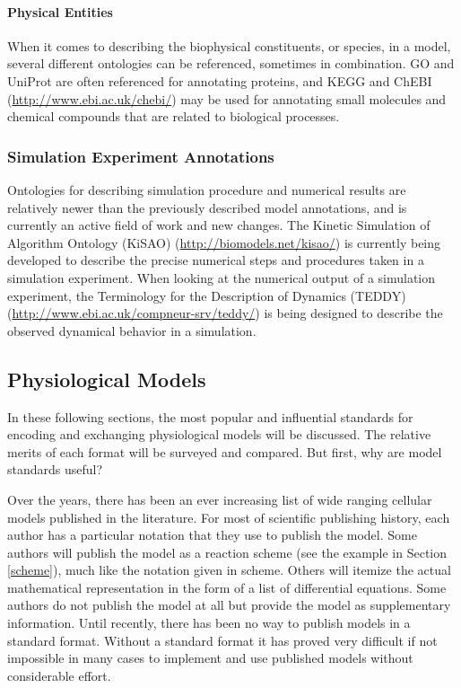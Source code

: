 \paragraph{Physical Entities}

When it comes to describing the biophysical constituents, or species, in
a model, several different ontologies can be referenced, sometimes in
combination. GO and UniProt are often referenced for annotating
proteins, and KEGG and ChEBI (\url{http://www.ebi.ac.uk/chebi/})
\autocite{degtyarenko2008chebi} may be used for annotating small
molecules and chemical compounds that are related to biological
processes.

\subsubsection{Simulation Experiment Annotations}

Ontologies for describing simulation procedure and numerical results are
relatively newer than the previously described model annotations, and is
currently an active field of work and new changes. The Kinetic
Simulation of Algorithm Ontology (KiSAO)
(\url{http://biomodels.net/kisao/}) is currently being developed to
describe the precise numerical steps and procedures taken in a
simulation experiment. When looking at the numerical output of a
simulation experiment, the Terminology for the Description of Dynamics
(TEDDY) (\url{http://www.ebi.ac.uk/compneur-srv/teddy/})
\autocite{courtot2011controlled} is being designed to describe the
observed dynamical behavior in a simulation.

\subsection{Physiological Models}

In these following sections, the most popular and influential standards
for encoding and exchanging physiological models will be discussed. The
relative merits of each format will be surveyed and compared. But first,
why are model standards useful?

Over the years, there has been an ever increasing list of wide ranging
cellular models published in the literature. For most of scientific
publishing history, each author has a particular notation that they use
to publish the model. Some authors will publish the model as a reaction
scheme (see the example in Section \ref{scheme}), much like the notation
given in scheme. Others will itemize the actual mathematical
representation in the form of a list of differential equations. Some
authors do not publish the model at all but provide the model as
supplementary information. Until recently, there has been no way to
publish models in a standard format. Without a standard format it has
proved very difficult if not impossible in many cases to implement and
use published models without considerable effort.

